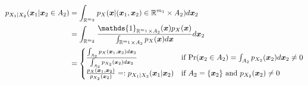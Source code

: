 \documentclass[12pt,a4paper]{article}
\begin{document}
\begin{itemize}
\begin{itemize}
\begin{align}
      p_{X_{1}|X_{2}}(\bm{x}_{1}|\bm{x}_{2}\in A_{2})
        & = \int_{\R^{m_{2}}}p_{X}(\bm{x}|(\bm{x}_{1},\bm{x}_{2})\in \R^{m_{1}}\times A_{2})d\bm{x}_{2} \nonumber \\
        & = \int_{\R^{m_{2}}}\frac{\mathds{1}_{\R^{m_{1}}\times A_{2}}(\bm{x})p_{X}(\bm{x})}{\int_{\R^{m_{1}}\times A_{2}}p_{X}(\bm{x})d\bm{x}} d\bm{x}_{2} \nonumber \\
        & = 
          \begin{cases}
            \frac{\int_{A_{2}}p_{X}(\bm{x}_{1},\bm{x}_{2})d\bm{x}_{2}}{\int_{A_{2}}p_{X_{2}}(\bm{x}_{2})d\bm{x}_{2}} & \text{if $\text{Pr}(\bm{x}_{2}\in A_{2}) = \int_{A_{2}}p_{X_{2}}(\bm{x}_{2})d\bm{x}_{2} \neq 0$} \\
            \frac{p_{X}(\bm{x}_{1},\bm{x}_{2})}{p_{X_{2}}(\bm{x}_{2})} =:p_{X_{1}|X_{2}}(\bm{x}_{1}|\bm{x}_{2}) & \text{if $A_{2} = \{\bm{x}_{2}\}$ and $p_{X_{2}}(\bm{x}_{2})\neq 0$}  \\
          \end{cases}
          \nonumber%
    \end{align}
  \end{itemize}


\end{itemize}
\end{document}
